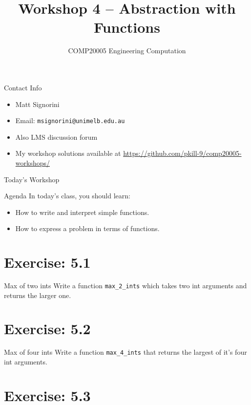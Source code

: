 \documentclass{beamer}
\title{Workshop 4 -- Abstraction with Functions}
\author{COMP20005 Engineering Computation}
\institute{The University of Melbourne}
\begin{document}
\begin{frame}
    \titlepage
\end{frame}

\begin{frame}{Contact Info}
    \begin{itemize}
        \item Matt Signorini
        \item Email: \texttt{msignorini@unimelb.edu.au}
        \item Also LMS discussion forum
        \item My workshop solutions available at \url{https://github.com/pkill-9/comp20005-workshops/}
    \end{itemize}
\end{frame}

\begin{frame}{Today's Workshop}
    \begin{block}{Agenda}
        In today's class, you should learn:
        \begin{itemize}
            \item How to write and interpret simple functions.
            \item How to express a problem in terms of functions.
        \end{itemize}
    \end{block}
\end{frame}

\section{Exercise: 5.1}

\begin{frame}{Max of two ints}
    Write a function \texttt{max\_2\_ints} which takes two int arguments
    and returns the larger one.
\end{frame}

\section{Exercise: 5.2}

\begin{frame}{Max of four ints}
    Write a function \texttt{max\_4\_ints} that returns the largest of it's
    four int arguments.
\end{frame}

\section{Exercise: 5.3}
\end{document}
